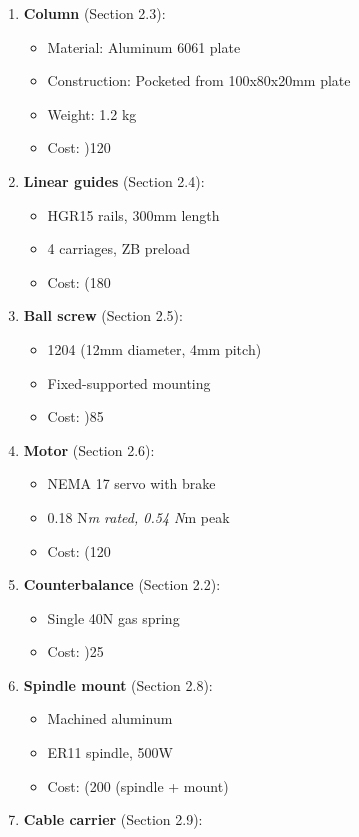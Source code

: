 \documentclass[
]{article}
\providecommand{\tightlist}{%
  \setlength{\itemsep}{0pt}\setlength{\parskip}{0pt}}
\begin{document}
\begin{enumerate}
\def\labelenumi{\arabic{enumi}.}
\tightlist
\item
  \textbf{Column} (Section 2.3):

  \begin{itemize}
  \tightlist
  \item
    Material: Aluminum 6061 plate
  \item
    Construction: Pocketed from 100x80x20mm plate
  \item
    Weight: 1.2 kg
  \item
    Cost: )120
  \end{itemize}
\item
  \textbf{Linear guides} (Section 2.4):

  \begin{itemize}
  \tightlist
  \item
    HGR15 rails, 300mm length
  \item
    4 carriages, ZB preload
  \item
    Cost: (180
  \end{itemize}
\item
  \textbf{Ball screw} (Section 2.5):

  \begin{itemize}
  \tightlist
  \item
    1204 (12mm diameter, 4mm pitch)
  \item
    Fixed-supported mounting
  \item
    Cost: )85
  \end{itemize}
\item
  \textbf{Motor} (Section 2.6):

  \begin{itemize}
  \tightlist
  \item
    NEMA 17 servo with brake
  \item
    0.18 N\emph{m rated, 0.54 N}m peak
  \item
    Cost: (120
  \end{itemize}
\item
  \textbf{Counterbalance} (Section 2.2):

  \begin{itemize}
  \tightlist
  \item
    Single 40N gas spring
  \item
    Cost: )25
  \end{itemize}
\item
  \textbf{Spindle mount} (Section 2.8):

  \begin{itemize}
  \tightlist
  \item
    Machined aluminum
  \item
    ER11 spindle, 500W
  \item
    Cost: (200 (spindle + mount)
  \end{itemize}
\item
  \textbf{Cable carrier} (Section 2.9):


\end{enumerate}
\end{document}
